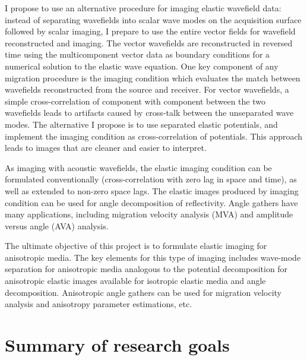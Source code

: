I propose to use an alternative procedure for imaging elastic wavefield data: instead of separating wavefields into scalar wave modes on the acquisition surface followed by scalar imaging, I prepare to use the entire vector fields for wavefield reconstructed and imaging. 
The vector wavefields are reconstructed in reversed time using the multicomponent vector data as boundary conditions for a numerical solution to the elastic wave equation. 
One key component of any migration procedure is the imaging condition which evaluates the match between wavefields reconstructed from the source and receiver. For vector wavefields, a simple cross-correlation of component with component between the two wavefields leads to artifacts caused by cross-talk between the unseparated wave modes. The alternative I propose is to use separated elastic potentials, and implement the imaging condition as cross-correlation of potentials. This approach leads to images that are cleaner and easier to interpret.

As imaging with acoustic wavefields, the elastic imaging condition can be formulated conventionally (cross-correlation with zero lag in space and time), as well as extended to non-zero space lags. The elastic images produced by imaging condition can be used for angle decomposition of reflectivity. Angle gathers have many applications, including migration velocity analysis (MVA) and amplitude versus angle (AVA) analysis.



The ultimate objective of this project is to formulate elastic imaging for anisotropic media. The key elements for this type of imaging includes wave-mode separation for anisotropic media analogous to the potential decomposition for anisotropic elastic images available for isotropic elastic media and angle decomposition. Anisotropic angle gathers can be used for migration velocity analysis and anisotropy parameter estimations, etc. %



\newpage
{}
\section{Summary of research  goals}

